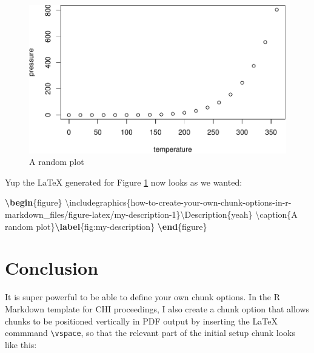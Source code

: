 \documentclass[sigchi, ]{acmart}
\newenvironment{Shaded}{\begin{snugshade}}{\end{snugshade}}
\newcommand{\BuiltInTok}[1]{#1}
\newcommand{\ExtensionTok}[1]{#1}
\newcommand{\FunctionTok}[1]{\textcolor[rgb]{0.00,0.00,0.00}{#1}}
\newcommand{\KeywordTok}[1]{\textcolor[rgb]{0.13,0.29,0.53}{\textbf{#1}}}
\newcommand{\NormalTok}[1]{#1}
\begin{document}
\begin{figure}
\includegraphics{how-to-create-your-own-chunk-options-in-r-markdown_files/figure-latex/my-description-correct-1} \caption[A random plot]{A random plot}\label{fig:my-description-correct}
\end{figure}

Yup the LaTeX generated for Figure \ref{fig:my-description-correct} now looks as we wanted:

\begin{Shaded}
\begin{Highlighting}[]
\KeywordTok{\textbackslash{}begin}\NormalTok{\{}\ExtensionTok{figure}\NormalTok{\}}
\BuiltInTok{\textbackslash{}includegraphics}\NormalTok{\{}\ExtensionTok{how-to-create-your-own-chunk-options-in-r-markdown_files/figure-latex/my-description-1}\NormalTok{\}}\FunctionTok{\textbackslash{}Description}\NormalTok{\{yeah\} }\FunctionTok{\textbackslash{}caption}\NormalTok{\{A random plot\}}\KeywordTok{\textbackslash{}label}\NormalTok{\{}\ExtensionTok{fig:my-description}\NormalTok{\}}
\KeywordTok{\textbackslash{}end}\NormalTok{\{}\ExtensionTok{figure}\NormalTok{\}}
\end{Highlighting}
\end{Shaded}

\hypertarget{conclusion}{%
\section{Conclusion}\label{conclusion}}

It is super powerful to be able to define your own chunk options. In the R Markdown template for CHI proceedings, I also create a chunk option that allows chunks to be positioned vertically in PDF output by inserting the LaTeX commmand \texttt{\textbackslash{}vspace}, so that the relevant part of the initial setup chunk looks like this:
\end{document}
